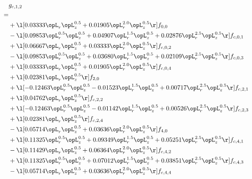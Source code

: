 \begin{alignat}{2} 
\label{eq:g_12_0} 
& g_{c,1,2} \nonumber \\ 
 = \\ 
& + \l[  0.03333 \opL_r \opL_z^{0.5} +  0.01905 \opL_r^{2.0} \opL_z^{0.5}  \r] f_{0,0} \nonumber \\ 
& - \l[  0.09853 \opL_r^{0.5} \opL_z^{0.5} +  0.04907 \opL_r^{1.5} \opL_z^{0.5} +  0.02876 \opL_r^{2.5} \opL_z^{0.5}  \r] f_{c,0,1} \nonumber \\ 
& + \l[  0.06667 \opL_r \opL_z^{0.5} +  0.03333 \opL_r^{2.0} \opL_z^{0.5}  \r] f_{c,0,2} \nonumber \\ 
& - \l[  0.09853 \opL_r^{0.5} \opL_z^{0.5} +  0.03680 \opL_r^{1.5} \opL_z^{0.5} +  0.02109 \opL_r^{2.5} \opL_z^{0.5}  \r] f_{c,0,3} \nonumber \\ 
& + \l[  0.03333 \opL_r \opL_z^{0.5} +  0.01905 \opL_r^{2.0} \opL_z^{0.5}  \r] f_{c,0,4} \nonumber \\ 
& + \l[  0.02381 \opL_r \opL_z^{0.5}  \r] f_{2,0} \nonumber \\ 
& + \l[  -0.12463 \opL_r^{0.5} \opL_z^{0.5}   -0.01523 \opL_r^{1.5} \opL_z^{0.5} +  0.00717 \opL_r^{2.5} \opL_z^{0.5}  \r] f_{c,2,1} \nonumber \\ 
& + \l[  0.04762 \opL_r \opL_z^{0.5}  \r] f_{c,2,2} \nonumber \\ 
& + \l[  -0.12463 \opL_r^{0.5} \opL_z^{0.5}   -0.01142 \opL_r^{1.5} \opL_z^{0.5} +  0.00526 \opL_r^{2.5} \opL_z^{0.5}  \r] f_{c,2,3} \nonumber \\ 
& + \l[  0.02381 \opL_r \opL_z^{0.5}  \r] f_{c,2,4} \nonumber \\ 
& - \l[  0.05714 \opL_r \opL_z^{0.5} +  0.03636 \opL_r^{2.0} \opL_z^{0.5}  \r] f_{4,0} \nonumber \\ 
& + \l[  0.11325 \opL_r^{0.5} \opL_z^{0.5} +  0.09349 \opL_r^{1.5} \opL_z^{0.5} +  0.05251 \opL_r^{2.5} \opL_z^{0.5}  \r] f_{c,4,1} \nonumber \\ 
& - \l[  0.11429 \opL_r \opL_z^{0.5} +  0.06364 \opL_r^{2.0} \opL_z^{0.5}  \r] f_{c,4,2} \nonumber \\ 
& + \l[  0.11325 \opL_r^{0.5} \opL_z^{0.5} +  0.07012 \opL_r^{1.5} \opL_z^{0.5} +  0.03851 \opL_r^{2.5} \opL_z^{0.5}  \r] f_{c,4,3} \nonumber \\ 
& - \l[  0.05714 \opL_r \opL_z^{0.5} +  0.03636 \opL_r^{2.0} \opL_z^{0.5}  \r] f_{c,4,4} \nonumber \\ 
\end{alignat} 


